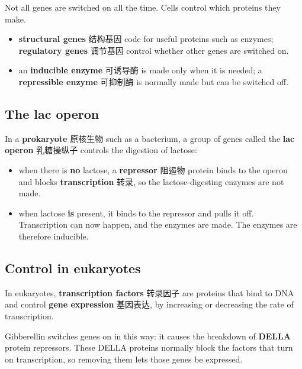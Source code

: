 \documentclass[11pt]{article}
\begin{document}
Not all genes are switched on all the time. Cells control which proteins they make.

\begin{itemize}
\item \textbf{structural genes} 结构基因 code for useful proteins such as enzymes; \textbf{regulatory genes} 调节基因 control whether other genes are switched on.

\item an \textbf{inducible enzyme} 可诱导酶 is made only when it is needed; a \textbf{repressible enzyme} 可抑制酶 is normally made but can be switched off.

\end{itemize}

\subsection*{The lac operon}

In a \textbf{prokaryote} 原核生物 such as a bacterium, a group of genes called the \textbf{lac operon} 乳糖操纵子 controls the digestion of lactose:

\begin{itemize}
\item when there is \textbf{no} lactose, a \textbf{repressor} 阻遏物 protein binds to the operon and blocks \textbf{transcription} 转录, so the lactose-digesting enzymes are not made.

\item when lactose \textbf{is} present, it binds to the repressor and pulls it off. Transcription can now happen, and the enzymes are made. The enzymes are therefore inducible.

\end{itemize}

\subsection*{Control in eukaryotes}

In eukaryotes, \textbf{transcription factors} 转录因子 are proteins that bind to DNA and control \textbf{gene expression} 基因表达, by increasing or decreasing the rate of transcription.

Gibberellin switches genes on in this way: it causes the breakdown of \textbf{DELLA} protein repressors. These DELLA proteins normally block the factors that turn on transcription, so removing them lets those genes be expressed.
\end{document}
